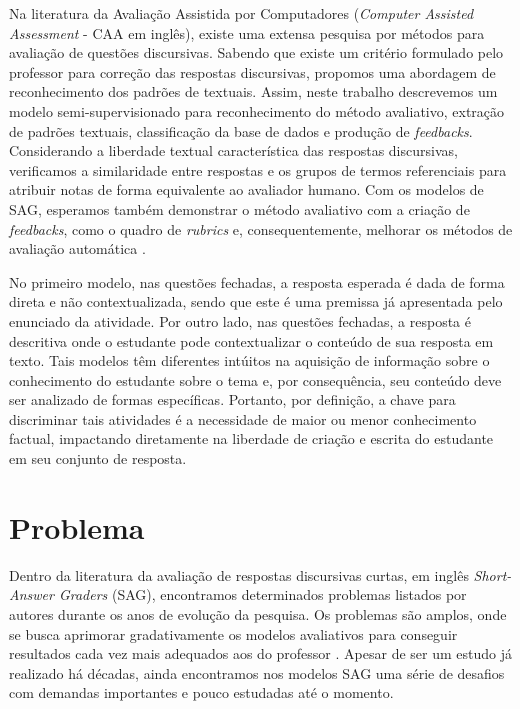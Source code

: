 Na literatura da Avaliação Assistida por Computadores (\textit{Computer Assisted Assessment} - CAA em inglês), existe uma extensa pesquisa por métodos para avaliação de questões discursivas. Sabendo que existe um critério formulado pelo professor para correção das respostas discursivas, propomos uma abordagem de reconhecimento dos padrões de textuais. Assim, neste trabalho descrevemos um modelo semi-supervisionado para reconhecimento do método avaliativo, extração de padrões textuais, classificação da base de dados e produção de \textit{feedbacks}. Considerando a liberdade textual característica das respostas discursivas, verificamos a similaridade entre respostas e os grupos de termos referenciais para atribuir notas de forma equivalente ao avaliador humano. Com os modelos de SAG, esperamos também demonstrar o método avaliativo com a criação de \textit{feedbacks}, como o quadro de \textit{rubrics} \cite{arter2006} e, consequentemente, melhorar os métodos de avaliação automática \cite{spalenza2016a}.


No primeiro modelo, nas questões fechadas, a resposta esperada é dada de forma direta e não contextualizada, sendo que este é uma premissa já apresentada pelo enunciado da atividade. Por outro lado, nas questões fechadas, a resposta é descritiva onde o estudante pode contextualizar o conteúdo de sua resposta em texto. Tais modelos têm diferentes intúitos na aquisição de informação sobre o conhecimento do estudante sobre o tema e, por consequência, seu conteúdo deve ser analizado de formas específicas. Portanto, por definição, a chave para discriminar tais atividades é a necessidade de maior ou menor conhecimento factual, impactando diretamente na liberdade de criação e escrita do estudante em seu conjunto de resposta. 

\section{Problema} 
\label{cap1-problema}

Dentro da literatura da avaliação de respostas discursivas curtas, em inglês \textit{Short-Answer Graders} (SAG), encontramos determinados problemas listados por autores durante os anos de evolução da pesquisa. Os problemas são amplos, onde se busca aprimorar gradativamente os modelos avaliativos para conseguir resultados cada vez mais adequados aos do professor \cite{pado2021}. Apesar de ser um estudo já realizado há décadas, ainda encontramos nos modelos SAG uma série de desafios com demandas importantes e pouco estudadas até o momento.

